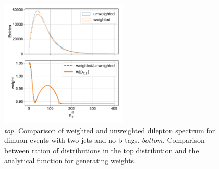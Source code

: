 \begin{figure}[ht]
    \centering
    \includegraphics[width=0.55\textwidth]{chapters/Analysis/sectionDataset/figures/z_pt_weighting}
    \caption{\emph{top.} Comparison of weighted and unweighted dilepton \pt spectrum for dimuon events with two jets and no b tags. \emph{bottom.} Comparison between ration of distributions in the top distribution and the analytical function for generating weights.}
    \label{fig:analysis:dataset:ww_weight}
\end{figure}




